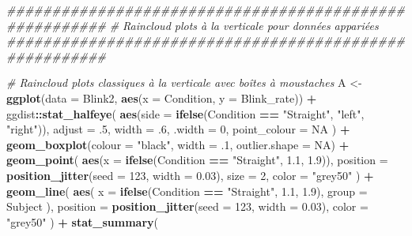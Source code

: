 \documentclass[
  french,
]{book}
\newenvironment{Shaded}{\begin{snugshade}}{\end{snugshade}}
\newcommand{\CommentTok}[1]{\textcolor[rgb]{0.56,0.35,0.01}{\textit{#1}}}
\newcommand{\DataTypeTok}[1]{\textcolor[rgb]{0.13,0.29,0.53}{#1}}
\newcommand{\DecValTok}[1]{\textcolor[rgb]{0.00,0.00,0.81}{#1}}
\newcommand{\FloatTok}[1]{\textcolor[rgb]{0.00,0.00,0.81}{#1}}
\newcommand{\KeywordTok}[1]{\textcolor[rgb]{0.13,0.29,0.53}{\textbf{#1}}}
\newcommand{\NormalTok}[1]{#1}
\newcommand{\OperatorTok}[1]{\textcolor[rgb]{0.81,0.36,0.00}{\textbf{#1}}}
\newcommand{\OtherTok}[1]{\textcolor[rgb]{0.56,0.35,0.01}{#1}}
\newcommand{\StringTok}[1]{\textcolor[rgb]{0.31,0.60,0.02}{#1}}
\begin{document}
\begin{Shaded}
\begin{Highlighting}[]
\CommentTok{#######################################################}
\CommentTok{# Raincloud plots à la verticale pour données appariées}
\CommentTok{#######################################################}

\CommentTok{# Raincloud plots classiques à la verticale avec boîtes à moustaches}
\NormalTok{A <-}
\StringTok{  }\KeywordTok{ggplot}\NormalTok{(}\DataTypeTok{data =}\NormalTok{ Blink2, }\KeywordTok{aes}\NormalTok{(}\DataTypeTok{x =}\NormalTok{ Condition, }\DataTypeTok{y =}\NormalTok{ Blink_rate)) }\OperatorTok{+}
\StringTok{  }\NormalTok{ggdist}\OperatorTok{::}\KeywordTok{stat_halfeye}\NormalTok{(}
    \KeywordTok{aes}\NormalTok{(}\DataTypeTok{side =} \KeywordTok{ifelse}\NormalTok{(Condition }\OperatorTok{==}\StringTok{ "Straight"}\NormalTok{, }\StringTok{"left"}\NormalTok{, }\StringTok{"right"}\NormalTok{)),}
    \DataTypeTok{adjust =} \FloatTok{.5}\NormalTok{, }
    \DataTypeTok{width =} \FloatTok{.6}\NormalTok{, }
    \DataTypeTok{.width =} \DecValTok{0}\NormalTok{, }
    \DataTypeTok{point_colour =} \OtherTok{NA}
\NormalTok{    ) }\OperatorTok{+}
\StringTok{  }\KeywordTok{geom_boxplot}\NormalTok{(}\DataTypeTok{colour =} \StringTok{"black"}\NormalTok{, }\DataTypeTok{width =} \FloatTok{.1}\NormalTok{, }\DataTypeTok{outlier.shape =} \OtherTok{NA}\NormalTok{) }\OperatorTok{+}
\StringTok{  }\KeywordTok{geom_point}\NormalTok{(}
    \KeywordTok{aes}\NormalTok{(}\DataTypeTok{x =} \KeywordTok{ifelse}\NormalTok{(Condition }\OperatorTok{==}\StringTok{ "Straight"}\NormalTok{, }\FloatTok{1.1}\NormalTok{, }\FloatTok{1.9}\NormalTok{)),}
    \DataTypeTok{position =} \KeywordTok{position_jitter}\NormalTok{(}\DataTypeTok{seed =} \DecValTok{123}\NormalTok{, }\DataTypeTok{width =} \FloatTok{0.03}\NormalTok{),}
    \DataTypeTok{size =} \DecValTok{2}\NormalTok{,}
    \DataTypeTok{color =} \StringTok{"grey50"}
\NormalTok{  ) }\OperatorTok{+}
\StringTok{  }\KeywordTok{geom_line}\NormalTok{(}
    \KeywordTok{aes}\NormalTok{(}
      \DataTypeTok{x =} \KeywordTok{ifelse}\NormalTok{(Condition }\OperatorTok{==}\StringTok{ "Straight"}\NormalTok{, }\FloatTok{1.1}\NormalTok{, }\FloatTok{1.9}\NormalTok{),}
      \DataTypeTok{group =}\NormalTok{ Subject}
\NormalTok{      ),}
    \DataTypeTok{position =} \KeywordTok{position_jitter}\NormalTok{(}\DataTypeTok{seed =} \DecValTok{123}\NormalTok{, }\DataTypeTok{width =} \FloatTok{0.03}\NormalTok{),}
    \DataTypeTok{color =} \StringTok{"grey50"}
\NormalTok{  ) }\OperatorTok{+}
\StringTok{  }\KeywordTok{stat_summary}\NormalTok{(}

\end{Highlighting}
\end{Shaded}
\end{document}
